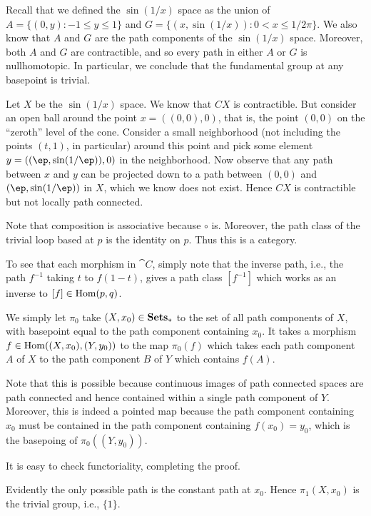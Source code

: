 \documentclass[../../solutions.tex]{subfiles}
\begin{document}
\begin{exercise} \leavevmode
Recall that we defined the $\sin(1/x)$ space as the union of $A=\{(0,y):-1\le y\le1\}$ and $G=\{(x,\sin(1/x)):0<x\le1/2\pi\}$. We also know that $A$ and $G$ are the path components of the $\sin(1/x)$ space. Moreover, both $A$ and $G$ are contractible, and so every path in either $A$ or $G$ is nullhomotopic. In particular, we conclude that the fundamental group at any basepoint is trivial.  
\end{exercise} 

\begin{exercise} \leavevmode 
Let $X$ be the $\sin(1/x)$ space. We know that $CX$ is contractible. But consider an open ball around the point $x=((0,0),0)$, that is, the point $(0,0)$ on the ``zeroth'' level of the cone. Consider a small neighborhood (not including the points $(t,1)$, in particular) around this point and pick some element $y=((\ep,\sin(1/\ep)),0)$ in the neighborhood. Now observe that any path between $x$ and $y$ can be projected down to a path between $(0,0)$ and $(\ep,\sin(1/\ep))$ in $X$, which we know does not exist. Hence $CX$ is contractible but not locally path connected. 
\end{exercise}

\begin{exercise} \leavevmode
Note that composition is associative because $\circ$ is. Moreover, the path class of the trivial loop based at $p$ is the identity on $p$. Thus this is a category. 

To see that each morphism in $\cat C$, simply note that the inverse path, i.e., the path $f^{-1}$ taking $t$ to $f(1-t)$, gives a path class $[f^{-1}]$ which works as an inverse to $[f]\in\operatorname{Hom}(p,q)$. 
\end{exercise}

\begin{exercise} \leavevmode 
We simply let $\pi_0$ take $(X,x_0)\in\textbf{Sets}_*$ to the set of all path components of $X$, with basepoint equal to the path component containing $x_0$. It takes a morphism $f\in\operatorname{Hom}((X,x_0),(Y,y_0))$ to the map $\pi_0(f)$ which takes each path component $A$ of $X$ to the path component $B$ of $Y$ which contains $f(A)$. 

Note that this is possible because continuous images of path connected spaces are path connected and hence contained within a single path component of $Y$. Moreover, this is indeed a pointed map because the path component containing $x_0$ must be contained in the path component containing $f(x_0)=y_0$, which is the basepoing of $\pi_0((Y,y_0))$. 

It is easy to check functoriality, completing the proof. 
\end{exercise}

\begin{exercise} \leavevmode
Evidently the only possible path is the constant path at $x_0$. Hence $\pi_1(X,x_0)$ is the trivial group, i.e., $\{1\}$. 
\end{exercise}
\end{document}
